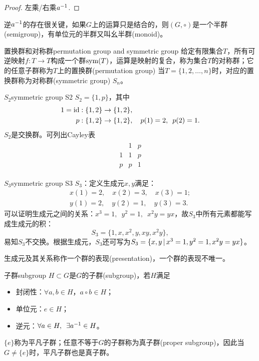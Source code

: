 \begin{proof}
	左乘/右乘$a^{-1}$.
\end{proof}
\begin{remark}
	逆$a^{-1}$的存在很关键，如果$G$上的运算只是结合的，则$(G, \circ)$是一个半群(semigroup)，有单位元的半群又叫幺半群(monoid)。
\end{remark}
\begin{definition}{置换群和对称群}{permutation group and symmetric group}
	给定有限集合$T$，所有可逆映射$f:T \to T$构成一个群$\operatorname{sym}(T)$，运算是映射的复合，称为集合$T$的对称群；它的任意子群称为$T$上的置换群(permutation group)
	\tcblower
	当$T = \{1,2,\ldots,n\}$时，对应的置换群称为对称群(symmetric group) $S_n$。
\end{definition}
\begin{example}{$S_2$}{symmetric group S2}
	$S_2 = \{1,p\}$，其中
		\begin{align*}
			1 = \operatorname{id}:\{1,2\} \to \{1,2\}&,\\
			p:\{1,2\} \to \{1,2\}&,\quad p(1) = 2,\enspace p(2) = 1.
		\end{align*}
		$S_2$是交换群。可列出Cayley表
		\begin{align*}
			\begin{array}{c|cc}
				&1&p\\
				\hline
				1&1&p\\
				p&p&1
			\end{array}
		\end{align*}
\end{example}
\begin{example}{$S_3$}{symmetric group S3}
	$S_3$：定义生成元$x,y$满足：
	\begin{align*}
		x(1) = 2,\quad x(2) = 3,\quad x(3) = 1;\\
		y(1) = 2,\quad y(2) = 1,\quad y(3) = 3.
	\end{align*}
	可以证明生成元之间的关系：$x^3 = 1,\enspace y^2 = 1,\enspace x^2y = yx$，故$S_3$中所有元素都能写成生成元的积：
	\[
		S_3 = \{1,x,x^2,y,xy,x^2y\},
	\]
	易知$S_3$不交换。根据生成元，$S_3$还可写为$S_3 = \{x,y\,\vert\,x^3 = 1,y^2 = 1,x^2y = yx\}$。
	
	生成元及其关系称作一个群的表现(presentation)，一个群的表现不唯一。
\end{example}
\begin{definition}{子群}{subgroup}
	$H \subset G$是$G$的子群(subgroup)，若$H$满足
	\begin{itemize}
		\item 封闭性：$\forall a,b \in H$，$a \circ b \in H$；
		\item 单位元：$e \in H$；
		\item 逆元：$\forall a \in H,\enspace\exists a^{-1} \in H$。
	\end{itemize}
	$\{e\}$称为平凡子群；任意不等于$G$的子群称为真子群(proper subgroup)，因此当$G \neq \{e\}$时，平凡子群也是真子群。
\end{definition}

